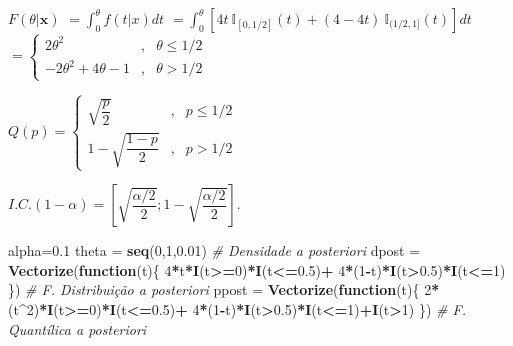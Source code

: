 \documentclass[
]{book}
\newenvironment{Shaded}{\begin{snugshade}}{\end{snugshade}}
\newcommand{\CommentTok}[1]{\textcolor[rgb]{0.56,0.35,0.01}{\textit{#1}}}
\newcommand{\ControlFlowTok}[1]{\textcolor[rgb]{0.13,0.29,0.53}{\textbf{#1}}}
\newcommand{\DecValTok}[1]{\textcolor[rgb]{0.00,0.00,0.81}{#1}}
\newcommand{\FloatTok}[1]{\textcolor[rgb]{0.00,0.00,0.81}{#1}}
\newcommand{\KeywordTok}[1]{\textcolor[rgb]{0.13,0.29,0.53}{\textbf{#1}}}
\newcommand{\NormalTok}[1]{#1}
\newcommand{\OperatorTok}[1]{\textcolor[rgb]{0.81,0.36,0.00}{\textbf{#1}}}
\newcommand{\StringTok}[1]{\textcolor[rgb]{0.31,0.60,0.02}{#1}}
\begin{document}
\(F(\theta|\boldsymbol x)\) \(=\displaystyle \int_0^\theta f(t|x)dt\)
\(=\displaystyle \int_0^\theta\left[4t~\mathbb I_{[0,1/2]}(t)+(4-4t)~\mathbb I_{(1/2,1]}(t)\right]dt\)
\(=\left\{\begin{array}{lcc} 2\theta^2 &,& \theta\leq 1/2\\ -2\theta^2+4\theta-1 &,& \theta>1/2\end{array}\right.\)

\(Q(p)=\left\{\begin{array}{lcc} \sqrt{\dfrac{p}{2}} &,& p\leq 1/2\\ 1-\sqrt{\dfrac{1-p}{2}} &,& p>1/2\end{array}\right.\)

\(I.C.(1-\alpha)=\left[\sqrt{\dfrac{\alpha/2}{2}};1-\sqrt{\dfrac{\alpha/2}{2}}\right]\).

\begin{Shaded}
\begin{Highlighting}[]
\NormalTok{alpha=}\FloatTok{0.1}
\NormalTok{theta =}\StringTok{ }\KeywordTok{seq}\NormalTok{(}\DecValTok{0}\NormalTok{,}\DecValTok{1}\NormalTok{,}\FloatTok{0.01}\NormalTok{)}
\CommentTok{# Densidade a posteriori}
\NormalTok{dpost =}\StringTok{ }\KeywordTok{Vectorize}\NormalTok{(}\ControlFlowTok{function}\NormalTok{(t)\{ }\DecValTok{4}\OperatorTok{*}\NormalTok{t}\OperatorTok{*}\KeywordTok{I}\NormalTok{(t}\OperatorTok{>=}\DecValTok{0}\NormalTok{)}\OperatorTok{*}\KeywordTok{I}\NormalTok{(t}\OperatorTok{<=}\FloatTok{0.5}\NormalTok{)}\OperatorTok{+}
\StringTok{    }\DecValTok{4}\OperatorTok{*}\NormalTok{(}\DecValTok{1}\OperatorTok{-}\NormalTok{t)}\OperatorTok{*}\KeywordTok{I}\NormalTok{(t}\OperatorTok{>}\FloatTok{0.5}\NormalTok{)}\OperatorTok{*}\KeywordTok{I}\NormalTok{(t}\OperatorTok{<=}\DecValTok{1}\NormalTok{) \})}
\CommentTok{# F. Distribuição a posteriori}
\NormalTok{ppost =}\StringTok{ }\KeywordTok{Vectorize}\NormalTok{(}\ControlFlowTok{function}\NormalTok{(t)\{ }\DecValTok{2}\OperatorTok{*}\NormalTok{(t}\OperatorTok{^}\DecValTok{2}\NormalTok{)}\OperatorTok{*}\KeywordTok{I}\NormalTok{(t}\OperatorTok{>=}\DecValTok{0}\NormalTok{)}\OperatorTok{*}\KeywordTok{I}\NormalTok{(t}\OperatorTok{<=}\FloatTok{0.5}\NormalTok{)}\OperatorTok{+}
\StringTok{    }\DecValTok{4}\OperatorTok{*}\NormalTok{(}\DecValTok{1}\OperatorTok{-}\NormalTok{t)}\OperatorTok{*}\KeywordTok{I}\NormalTok{(t}\OperatorTok{>}\FloatTok{0.5}\NormalTok{)}\OperatorTok{*}\KeywordTok{I}\NormalTok{(t}\OperatorTok{<=}\DecValTok{1}\NormalTok{)}\OperatorTok{+}\KeywordTok{I}\NormalTok{(t}\OperatorTok{>}\DecValTok{1}\NormalTok{) \})}
\CommentTok{# F. Quantílica a posteriori}

\end{Highlighting}
\end{Shaded}
\end{document}

